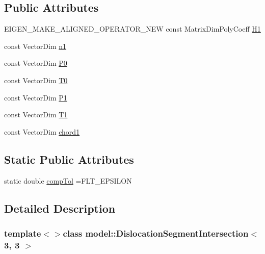 \subsection*{Public Attributes}
\begin{DoxyCompactItemize}
\item 
E\+I\+G\+E\+N\+\_\+\+M\+A\+K\+E\+\_\+\+A\+L\+I\+G\+N\+E\+D\+\_\+\+O\+P\+E\+R\+A\+T\+O\+R\+\_\+\+N\+E\+W const Matrix\+Dim\+Poly\+Coeff \hyperlink{classmodel_1_1_dislocation_segment_intersection_3_013_00_013_01_4_a901e0201aff4c24fe19a13cdd8c4bf1e}{H1}
\item 
const Vector\+Dim \hyperlink{classmodel_1_1_dislocation_segment_intersection_3_013_00_013_01_4_a012b4e371bb7a9e67534af201d858411}{n1}
\item 
const Vector\+Dim \hyperlink{classmodel_1_1_dislocation_segment_intersection_3_013_00_013_01_4_a79f578b701556b2eb0fb3a91a4e3abe0}{P0}
\item 
const Vector\+Dim \hyperlink{classmodel_1_1_dislocation_segment_intersection_3_013_00_013_01_4_a3cfe99bfce53d3018023cbbf54f00ed7}{T0}
\item 
const Vector\+Dim \hyperlink{classmodel_1_1_dislocation_segment_intersection_3_013_00_013_01_4_a796f0d5a198e8eec0ac22b8afdc29e02}{P1}
\item 
const Vector\+Dim \hyperlink{classmodel_1_1_dislocation_segment_intersection_3_013_00_013_01_4_a1c3da7dd954492e63747f373084585a7}{T1}
\item 
const Vector\+Dim \hyperlink{classmodel_1_1_dislocation_segment_intersection_3_013_00_013_01_4_af915e9be16a2d3a547457d44ffa18b7b}{chord1}
\end{DoxyCompactItemize}
\subsection*{Static Public Attributes}
\begin{DoxyCompactItemize}
\item 
static double \hyperlink{classmodel_1_1_dislocation_segment_intersection_3_013_00_013_01_4_aa1721b1ea53709e6ff10c870ca859a93}{comp\+Tol} =F\+L\+T\+\_\+\+E\+P\+S\+I\+L\+O\+N
\end{DoxyCompactItemize}


\subsection{Detailed Description}
\subsubsection*{template$<$$>$class model\+::\+Dislocation\+Segment\+Intersection$<$ 3, 3 $>$}



